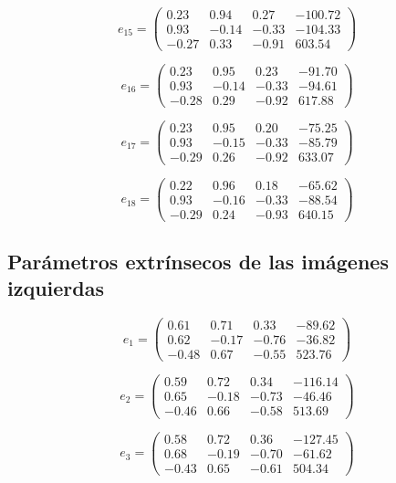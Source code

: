 \documentclass[a4paper,12pt]{article}
\begin{document}
{\[
e_{15} = \begin{pmatrix}
0.23 & 0.94 & 0.27 & -100.72 \\
0.93 & -0.14 & -0.33 & -104.33 \\
-0.27 & 0.33 & -0.91 & 603.54
\end{pmatrix}
\]

\[
e_{16} = \begin{pmatrix}
0.23 & 0.95 & 0.23 & -91.70 \\
0.93 & -0.14 & -0.33 & -94.61 \\
-0.28 & 0.29 & -0.92 & 617.88
\end{pmatrix}
\]

\[
e_{17} = \begin{pmatrix}
0.23 & 0.95 & 0.20 & -75.25 \\
0.93 & -0.15 & -0.33 & -85.79 \\
-0.29 & 0.26 & -0.92 & 633.07
\end{pmatrix}
\]

\[
e_{18} = \begin{pmatrix}
0.22 & 0.96 & 0.18 & -65.62 \\
0.93 & -0.16 & -0.33 & -88.54 \\
-0.29 & 0.24 & -0.93 & 640.15
\end{pmatrix}
\]

\subsection{Parámetros extrínsecos de las imágenes izquierdas} \label{appendix:b}

\[
e_1 = \begin{pmatrix}
0.61 & 0.71 & 0.33 & -89.62 \\
0.62 & -0.17 & -0.76 & -36.82 \\
-0.48 & 0.67 & -0.55 & 523.76
\end{pmatrix}
\]

\[
e_2 = \begin{pmatrix}
0.59 & 0.72 & 0.34 & -116.14 \\
0.65 & -0.18 & -0.73 & -46.46 \\
-0.46 & 0.66 & -0.58 & 513.69
\end{pmatrix}
\]

\[
e_3 = \begin{pmatrix}
0.58 & 0.72 & 0.36 & -127.45 \\
0.68 & -0.19 & -0.70 & -61.62 \\
-0.43 & 0.65 & -0.61 & 504.34
\end{pmatrix}
\]

}
\end{document}
